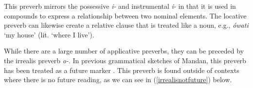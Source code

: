 This preverb mirrors the possessive \textit{i-} and instrumental \textit{i-} in that it is used in compounds to express a relationship between two nominal elements. The locative preverb can likewise create a relative clause that is treated like a noun, e.g., \textit{ówati} `my house' (lit. `where I live'). %

\label{ParaIrrealis}

While there are a large number of applicative preverbs, they can be preceded by the irrealis preverb \textit{o-}. In previous grammatical sketches of Mandan, this preverb has been treated as a future marker \citep{kennard1936,hollow1970,mixco1997a}. This preverb is found outside of contexts where there is no future reading, as we can see in (\ref{irrealisnotfuture}) below.

